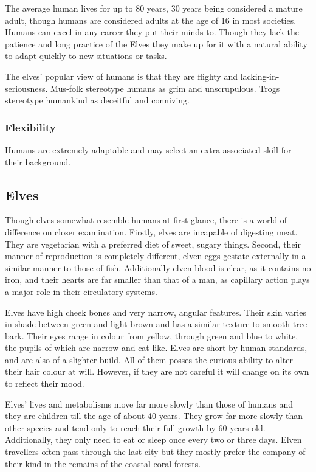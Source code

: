 \documentclass[a4paper,11pt,oneside]{book}
\begin{document}
The average human lives for up to 80 years, 30 years being considered a mature adult, though humans are considered adults at the age of 16 in most societies. Humans can excel in any career they put their minds to. Though they lack the patience and long practice of the Elves they make up for it with a natural ability to adapt quickly to new situations or tasks. 

The elves' popular view of humans is that they are flighty and lacking-in-seriousness. Mus-folk stereotype humans as grim and unscrupulous. Trogs stereotype humankind as deceitful and conniving.  

\subsubsection*{Flexibility}
Humans are extremely adaptable and may select an extra associated skill for their background.


\subsection{Elves}
Though elves somewhat resemble humans at first glance, there is a world of difference on closer examination. Firstly, elves are incapable of digesting meat. They are vegetarian with a preferred diet of sweet, sugary things. Second, their manner of reproduction is completely different, elven eggs gestate externally in a similar manner to those of fish. Additionally elven blood is clear, as it contains no iron, and their hearts are far smaller than that of a man, as capillary action plays a major role in their circulatory systems.

Elves have high cheek bones and very narrow, angular features. Their skin varies in shade between green and light brown and has a similar texture to smooth tree bark. Their eyes range in colour from yellow, through green and blue to white, the pupils of which are narrow and cat-like. Elves are short by human standards, and are also of a slighter build. All of them posses the curious ability to alter their hair colour at will. However, if they are not careful it will change on its own to reflect their mood. 

Elves' lives and metabolisms move far more slowly than those of humans and they are children till the age of about 40 years. They grow far more slowly than other species and tend only to reach their full growth by 60 years old. Additionally, they only need to eat or sleep once every two or three days. Elven travellers often pass through the last city but they mostly prefer the company of their kind in the remains of the coastal coral forests.
\end{document}
